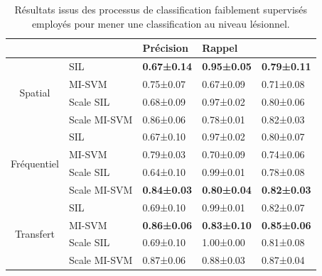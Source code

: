 \begin{table}[H]
    \centering
    \begin{tabular}{cllll}
        \toprule
        \multicolumn{1}{l}{}         &              & Précision          & Rappel             & \fscore{}            \\ \midrule
        \multirow{4}{*}{Spatial}     & SIL          & \textbf{0.67±0.14} & \textbf{0.95±0.05} & \textbf{0.79±0.11} \\
                                     & MI-SVM       & 0.75±0.07          & 0.67±0.09          & 0.71±0.08          \\
                                     & Scale SIL    & 0.68±0.09          & 0.97±0.02          & 0.80±0.06          \\
                                     & Scale MI-SVM & 0.86±0.06          & 0.78±0.01          & 0.82±0.03          \\ \midrule
        \multirow{4}{*}{Fréquentiel} & SIL          & 0.67±0.10          & 0.97±0.02          & 0.80±0.07          \\
                                     & MI-SVM       & 0.79±0.03          & 0.70±0.09          & 0.74±0.06          \\
                                     & Scale SIL    & 0.64±0.10          & 0.99±0.01          & 0.78±0.08          \\
                                     & Scale MI-SVM & \textbf{0.84±0.03} & \textbf{0.80±0.04} & \textbf{0.82±0.03} \\ \midrule
        \multirow{4}{*}{Transfert}   & SIL          & 0.69±0.10          & 0.99±0.01          & 0.82±0.07          \\
                                     & MI-SVM       & \textbf{0.86±0.06} & \textbf{0.83±0.10} & \textbf{0.85±0.06} \\
                                     & Scale SIL    & 0.69±0.10          & 1.00±0.00          & 0.81±0.08          \\
                                     & Scale MI-SVM & 0.87±0.06          & 0.88±0.03          & 0.87±0.04          \\ \bottomrule
    \end{tabular}
    \caption{Résultats issus des processus de classification faiblement supervisés employés pour mener une classification au niveau lésionnel.}
    \label{tab:results_lesion_classification_weakly_patient}
\end{table}\par

